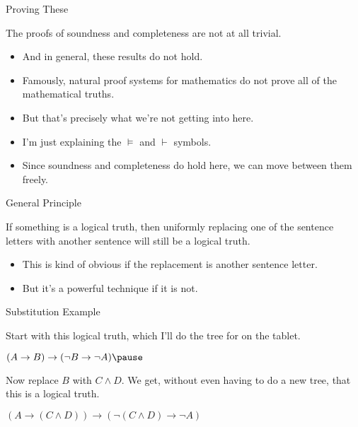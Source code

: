 \documentclass[
  ignorenonframetext,
]{beamer}
\providecommand{\tightlist}{%
  \setlength{\itemsep}{0pt}\setlength{\parskip}{0pt}}
\renewcommand{\,}{\text{, }}
\renewenvironment*{quote}	
	{\list{}{\rightmargin   \leftmargin} \item } 	
	{\endlist }
\begin{document}
\begin{frame}{Proving These}
\protect\hypertarget{proving-these}{}

The proofs of soundness and completeness are not at all trivial.

\begin{itemize}
\tightlist
\item
  And in general, these results do not hold.
\item
  Famously, natural proof systems for mathematics do not prove all of
  the mathematical truths.
\item
  But that's precisely what we're not getting into here.
\item
  I'm just explaining the \(\vDash\) and \(\vdash\) symbols.
\item
  Since soundness and completeness do hold here, we can move between
  them freely.
\end{itemize}

\end{frame}

\begin{frame}{General Principle}
\protect\hypertarget{general-principle}{}

If something is a logical truth, then uniformly replacing one of the
sentence letters with another sentence will still be a logical truth.

\begin{itemize}
\tightlist
\item
  This is kind of obvious if the replacement is another sentence letter.
\item
  But it's a powerful technique if it is not.
\end{itemize}

\end{frame}

\begin{frame}{Substitution Example}
\protect\hypertarget{substitution-example}{}

Start with this logical truth, which I'll do the tree for on the tablet.

\begin{quote}
\((A \rightarrow B) \rightarrow (\neg B \rightarrow \neg A) \pause\)
\end{quote}

Now replace \(B\) with \(C \wedge D\). We get, without even having to do
a new tree, that this is a logical truth.

\begin{quote}
\((A \rightarrow (C \wedge D)) \rightarrow (\neg (C \wedge D) \rightarrow \neg A)\)
\end{quote}

\end{frame}
\end{document}
